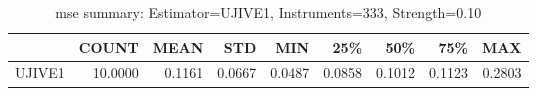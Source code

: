 \begin{table}[ht]
\centering
\caption{mse summary: Estimator=UJIVE1, Instruments=333, Strength=0.10}
\begin{tabular}{lrrrrrrrr}
\toprule
 & COUNT & MEAN & STD & MIN & 25\% & 50\% & 75\% & MAX \\
\midrule
UJIVE1 & 10.0000 & 0.1161 & 0.0667 & 0.0487 & 0.0858 & 0.1012 & 0.1123 & 0.2803 \\
\bottomrule
\end{tabular}
\end{table}
